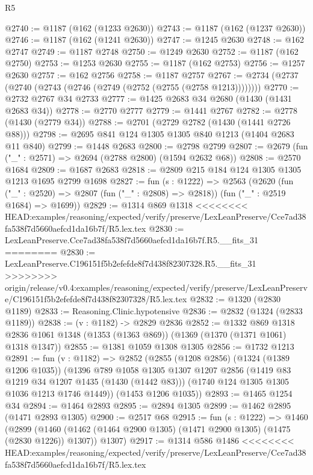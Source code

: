 \begin{lexlean}{R5}
\begin{coremodule}
{{{{{{{{{{{{{{{{{{{{{{{{{{{{{{{{{{{{{{{{{{{{{{{{{{{{{{{{{{{{{{{{{{{{{{{{{{{{{{{{{{{{@2740 := @1187 (@162 (@1233 @2630))
@2743 := @1187 (@162 (@1237 @2630))
@2746 := @1187 (@162 (@1241 @2630))
@2747 := @1245 @2630
@2748 := @162 @2747
@2749 := @1187 @2748
@2750 := @1249 @2630
@2752 := @1187 (@162 @2750)
@2753 := @1253 @2630
@2755 := @1187 (@162 @2753)
@2756 := @1257 @2630
@2757 := @162 @2756
@2758 := @1187 @2757
@2767 := @2734 (@2737 (@2740 (@2743 (@2746 (@2749 (@2752 (@2755 (@2758 @1213))))))))
@2770 := @2732 @2767 @34 @2733
@2777 := @1425 @2683 @34 @2680 (@1430 (@1431 @2683 @34))
@2778 := @2770 @2777
@2779 := @1441 @2767
@2782 := @2778 (@1430 (@2779 @34))
@2788 := @2701 (@2729 @2782 (@1430 (@1441 @2726 @88)))
@2798 := @2695 @841 @124 @1305 @1305 @840 @1213 (@1404 @2683 @11 @840)
@2799 := @1448 @2683
@2800 := @2798 @2799
@2807 := @2679 (fun ("_" : @2571) => @2694 (@2788 @2800) (@1594 @2632 @68))
@2808 := @2570 @1684
@2809 := @1687 @2683
@2818 := @2809 @215 @184 @124 @1305 @1305 @1213 @1695 @2799 @1698
@2827 := fun (s : @1222) =>
  @2563
    (@2620
      (fun ("_" : @2520) => @2807 (fun ("_" : @2808) => @2818))
      (fun ("_" : @2519 @1684) => @1699))
@2829 := @1314 @869 @1318
<<<<<<<< HEAD:examples/reasoning/expected/verify/preserve/LexLeanPreserve/Cce7ad38fa538f7d5660aefcd1da16b7f/R5.lex.tex
@2830 := LexLeanPreserve.Cce7ad38fa538f7d5660aefcd1da16b7f.R5.__fits_31
========
@2830 := LexLeanPreserve.C196151f5b2efefde8f7d438f82307328.R5.__fits_31
>>>>>>>> origin/release/v0.4:examples/reasoning/expected/verify/preserve/LexLeanPreserve/C196151f5b2efefde8f7d438f82307328/R5.lex.tex
@2832 := @1320 (@2830 @1189)
@2833 := Reasoning.Clinic.hypotensive
@2836 := @2832 (@1324 (@2833 @1189))
@2838 := (v : @1182) -> @2829 @2836
@2852 := @1332
    @869
    @1318
    @2836
    @1061
    @1348
    (@1353 (@1363 @869))
    (@1369 (@1370 (@1371 @1061) @1318 @1347))
@2855 := @1381 @1059 @1308 @1305
@2856 := @1732 @1213
@2891 := fun (v : @1182) =>
  @2852
    (@2855
      (@1208 @2856)
      (@1324 (@1389 @1206 @1035))
      (@1396
        @789
        @1058
        @1305
        @1307
        @1207
        @2856
        (@1419 @83 @1219 @34 @1207 @1435 (@1430 (@1442 @83)))
        (@1740 @124 @1305 @1305 @1036 @1213 @1746 @1449))
      (@1453 @1206 @1035))
@2893 := @1465 @1254 @34
@2894 := @1464 @2893
@2895 := @2894 @1305
@2899 := @1462 @2895 (@1471 @2893 @1305)
@2900 := @2517 @68
@2915 := fun (s : @1222) =>
  @1460
    (@2899
      (@1460 (@1462 (@1464 @2900 @1305) (@1471 @2900 @1305) (@1475 (@2830 @1226)) @1307))
      @1307)
@2917 := @1314 @586 @1486
<<<<<<<< HEAD:examples/reasoning/expected/verify/preserve/LexLeanPreserve/Cce7ad38fa538f7d5660aefcd1da16b7f/R5.lex.tex
}}}}}}}}}}}}}}}}}}}}}}}}}}}}}}}}}}}}}}}}}}}}}}}}}}}}}}}}}}}}}}}}}}}}}}}}}}}}}}}}}}}}
\end{coremodule}
\end{lexlean}
